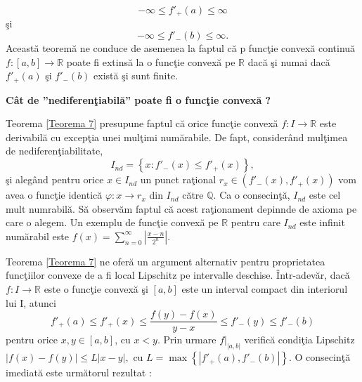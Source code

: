 \documentclass[a4paper,12pt,oneside]{report}
\begin{document}
\begin{displaymath}
   - \infty  \leq  {f}'_{+}\left ( a \right ) \leq \infty
\end{displaymath}
\c{s}i 
\begin{displaymath}
- \infty  \leq  {f}'_{-}\left ( b \right ) \leq \infty. 
\end{displaymath}
Aceast\u{a} teorem\u{a} ne conduce de asemenea la faptul c\u{a} p func\c{t}ie convex\u{a} continu\u{a} \(f:\left [ a,b \right ]\rightarrow \mathbb{R}\) poate fi extins\u{a} la o func\c{t}ie convex\u{a} pe \(\mathbb{R}\) dac\u{a} \c{s}i numai dac\u{a}   \({f}'_{+}\left ( a \right )\) \c{s}i  \( {f}'_{-}\left ( b \right )\)  exist\u{a} \c{s}i sunt finite. 

\textbf{C\^{a}t de ”nediferen\c{t}iabil\u{a}” poate fi o func\c{t}ie convex\u{a} ?}

Teorema \ref{Teorema 7} presupune faptul c\u{a} orice func\c{t}ie convex\u{a} \(f:I \rightarrow \mathbb{R}\) este derivabil\u{a} cu excep\c{t}ia unei mul\c{t}imi num\u{a}rabile. De fapt, consider\^{a}nd mul\c{t}imea de nediferen\c{t}iabilitate, 
\begin{displaymath}
   I_{nd} = \left \{ x : {f}'_{-}\left ( x \right )\leq {f}'_{+}\left ( x \right ) \right \}, 
\end{displaymath}
\c{s}i aleg\^{a}nd pentru orice \(x \in I_{nd}\) un punct ra\c{t}ional \(r_{x} \in \left ( {f}'_{-}\left ( x \right ),  {f}'_{+}\left ( x \right )  \right )\) vom avea o func\c{t}ie identic\u{a} \(\varphi : x \rightarrow r_{x}\) din \(I_{nd}\) c\u{a}tre \(\mathbb{Q}\). Ca o consecin\c{t}\u{a}, \(I_{nd}\) este cel mult numrabil\u{a}. S\u{a} observ\u{a}m faptul c\u{a} acest ra\c{t}ionament depinnde de axioma pe care o alegem. Un exemplu de func\c{t}ie convex\u{a} pe \(\mathbb{R}\) pentru care \(I_{nd}\) este infinit num\u{a}rabil este \(f\left ( x \right ) = \sum_{n = 0}^{\infty } \left | \frac{x-n}{2^{n}}\right |\). 

Teorema \ref{Teorema 7} ne ofer\u{a} un argument alternativ pentru proprietatea func\c{t}iilor convexe de a fi local Lipschitz pe intervalle deschise. \^{I}ntr-adev\u{a}r, dac\u{a} \(f : I \rightarrow \mathbb{R}\) este o func\c{t}ie convex\u{a} \c{s}i \(\left [ a,b \right ]\) este un interval compact din interiorul lui I, atunci 
\begin{displaymath}
   {f}'_{+}\left ( a \right ) \leq {f}'_{+}\left ( x \right )\leq \frac{f\left ( y \right )- f\left ( x \right )}{y-x}\leq  {f}'_{-}\left ( y \right )\leq {f}'_{-}\left ( b \right )
\end{displaymath}
pentru orice \(x,y \in \left [ a,b \right ]\), cu \(x< y\). Prin urmare \(f|_{\left | a,b \right |}\) verific\u{a} condi\c{t}ia Lipschitz \(\left | f\left ( x \right )  - f\left ( y \right )\right |\leq L\left | x-y \right |,\) cu \(L=\max \left \{ \left | {f}'_{+} \left ( a \right ),{f}'_{-} \left ( b \right ) \right | \right \}\). O consecin\c{t}\u{a} imediat\u{a} este urm\u{a}torul rezultat :
\end{document}
